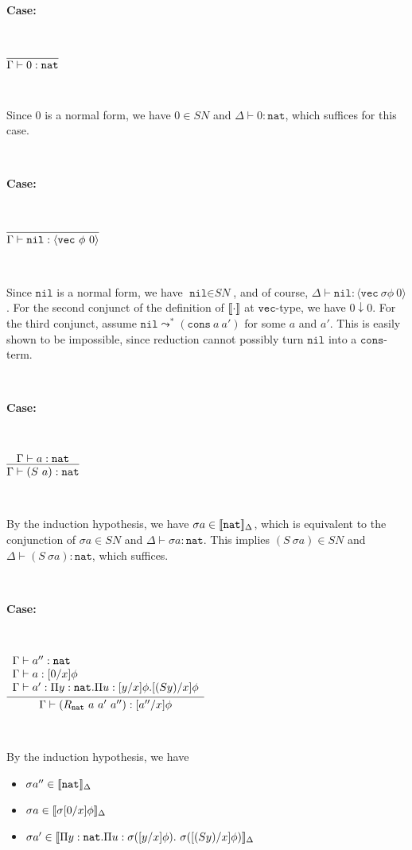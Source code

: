 \documentclass[copyright]{eptcs}
\newcommand{\SN}[0]{\textit{SN}}
\newcommand{\vc}[0]{\texttt{vec}}
\newcommand{\nat}[0]{\texttt{nat}}
\newcommand{\nil}[0]{\texttt{nil}}
\newcommand{\cons}[0]{\texttt{cons}}
\newcommand{\interp}[1]{[\negthinspace[#1]\negthinspace]}
\begin{document}
\ 

\noindent \textbf{Case:}

\

$\infer{\Gamma\vdash 0:\nat}{\ }$

\

\noindent Since $0$ is a normal form, we have $0\in\SN$ and
$\Delta\vdash 0:\nat$, which suffices for this case.

\ 

\noindent \textbf{Case:}

\

$\infer{\Gamma\vdash \nil:\langle\vc\ \phi\ 0\rangle}{\ }$

\ 

\noindent Since $\nil$ is a normal form, we have $\nil\in\SN$, and of
course, $\Delta\vdash\nil:\langle\vc\ \sigma \phi\ 0\rangle$. For the
second conjunct of the definition of $\interp{\cdot}$ at $\vc$-type,
we have $0\downarrow 0$. For the third conjunct, assume
$\nil\leadsto^*(\cons\ a\ a')$ for some $a$ and $a'$.  This is easily
shown to be impossible, since reduction cannot possibly turn $\nil$
into a $\cons$-term.

\ 

\noindent \textbf{Case:}

\

$\infer{\Gamma\vdash (S\ a):\nat}{\Gamma\vdash a:\nat  }$

\ 

\noindent By the induction hypothesis, we have $\sigma
a\in\interp{\nat}_\Delta$, which is equivalent to the conjunction of
$\sigma a\in\SN$ and $\Delta\vdash \sigma a:\nat$.  This implies
$(S\ \sigma a)\in\SN$ and $\Delta\vdash (S\ \sigma a):\nat$, which
suffices.

\ 

\noindent \textbf{Case:}

\

$\infer{\Gamma\vdash (R_\nat\ a\ a'\ a''):[a''/x]\phi}
      {\begin{array}{l}\Gamma \vdash a'' : \nat \\
       \Gamma \vdash a : [0/x]\phi \\
       \Gamma \vdash a' : \Pi y:\nat. \Pi u : [y/x]\phi. [(S y)/x]\phi
       \end{array}}$

\ 

\noindent By the induction hypothesis, we have
\begin{itemize}
\item $\sigma a''\in\interp{\nat}_\Delta$
\item $\sigma a\in\interp{\sigma[0/x]\phi}_\Delta$
\item $\sigma a'\in\interp{\Pi y:\nat.\Pi u:\sigma([y/x]\phi).\ \sigma([(S y)/x]\phi)}_\Delta$
\end{itemize}
\end{document}
